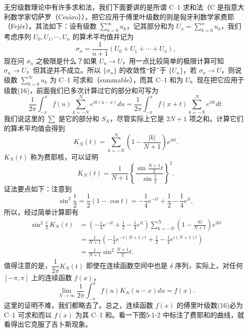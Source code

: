 无穷级数理论中有许多求和法，我们下面要讲的是所谓 C--1 求和法（C 是指意大利数学家切萨罗（Cesàro）），把它应用于傅里叶级数的则是匈牙利数学家费耶（Fejér）。其法如下：设有级数 $\sum_{k=0}^{\infty}u_k$，记其部分和为 $U_n=\sum_{k=0}^{n}u_k$，我们考虑序列 $U_0,U_1,\cdots,U_n$ 的算术平均值并记为
\[
 \sigma_n=\frac1{n+1}(U_0+U_1+\cdots+U_n),
\]
现在问 $\sigma_n$ 之极限是什么？如果 $U_n\to U$，用一点比较简单的极限计算可知 $\sigma_n\to U$，但其逆并不成立。所以 $\{\sigma_n\}$ 的收敛性“好”于 $\{U_n\}$，若 $\sigma_n\to U$，则说级数 $\sum_{k=0}^{\infty}u_k$ 为 C--1 可求和（summable），而其 C--1 和为 $U$。现在把它应用于级数(16)，前面我们已多次计算过它的部分和可写为
\[
 \frac1{2\pi}\int_{-\pi}^{\pi}f(u)\sum_{k=-N}^{N}e^{ik(u-x)}du
 =\frac1{2\pi}\int_{-\pi}^{\pi}f(x+t)\sum_{k=-N}^{N}e^{ikt}dt.
\]
我们说这里的 $\sum$ 是它的部分和 $S_N$，尽管实际上它是 $2N+1$ 项之和。计算它们的算术平均值会得到
\[
 K_N(t)=\sum_{k=-N}^{N}\left(1-\frac{|k|}{N+1}\right)e^{ikt}.
\]
$K_N(t)$ 称为费耶核，可以证明
\[
 K_N(t)=\frac1{N+1}\left\{\frac{\sin\frac{N+1}{2}t}{\sin\frac t2}\right\}^2.
\]
证法要点如下：注意到
\[
 \sin^2\frac t2=\frac12(1-\cos t)=-\frac14e^{-it}+\frac12-\frac14e^{it},
\]
所以，经过简单计算即有
\[
 \begin{aligned}
 \sin^2\frac t2\,K_N(t)
 &=\left(-\frac14e^{-it}+\frac12-\frac14e^{it}\right)
 \sum_{k=-N}^{N}\left(1-\frac{|k|}{N+1}\right)e^{ikt}\\
 &=\frac1{N+1}\left(-\frac14e^{-i(N+1)t}+\frac12-\frac14e^{i(N+1)t}\right)\\
 &=\frac1{N+1}\sin^2\frac{N+1}{2}t.
 \end{aligned}
\]
值得注意的是，$\dfrac1{2\pi}K_N(t)$ 即使在连续函数空间中也是 $\delta$ 序列，实际上，对任何 $[-\pi,\pi]$ 上的连续函数 $f(x)$，
\[
 \lim_{N\to\infty}\frac1{2\pi}\int_{-\pi}^{\pi}f(u)K_N(u-x)du=f(x).
\]
这里的证明不难，我们都略去了。总之，连续函数 $f(x)$ 的傅里叶级数(16)必为 C--1 可求和而以 $f(x)$ 为其 C--1 和。看一下图5-1-2 中标注了费耶和的曲线，就看得出它克服了吉卜斯现象。
